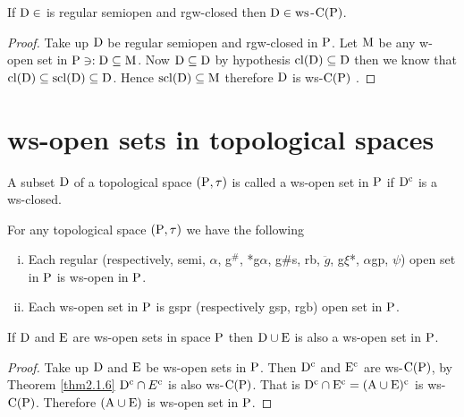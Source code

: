 \begin{thm}\label{thm2.1.25}
If $\mathrm{D}\in$ is regular semiopen and rgw-closed then $\mathrm{D}\in\mathrm{ws}$-$\mathrm{C}(\mathrm{P})$.
\end{thm}

\begin{proof}
Take up $\mathrm{D}$ be regular semiopen and rgw-closed in $\mathrm{P}$. Let $\mathrm{M}$ be any w-open set in $\mathrm{P} \ni: \mathrm{D}\subseteq \mathrm{M}$. Now $\mathrm{D}\subseteq \mathrm{D}$ by hypothesis $\mathrm{cl}(\mathrm{D})\subseteq \mathrm{D}$ then we know that $\mathrm{cl}(\mathrm{D}) \subseteq \mathrm{scl}(\mathrm{D})\subseteq \mathrm{D}$. Hence $\mathrm{scl}(\mathrm{D})\subseteq \mathrm{M}$ therefore $\mathrm{D}$ is ws-$\mathrm{C}(\mathrm{P})$ .
\end{proof}

\section{ws-open sets in topological spaces}\label{sec2.2}

\begin{dfn}\label{defi2.2.1}
A subset $\mathrm{D}$ of a topological space $(\mathrm{P},\tau)$ is called a ws-open set in $\mathrm{P}$ if $\mathrm{D}^{\text{c}}$ is a ws-closed.
\end{dfn}

\begin{thm}\label{thm2.2.1}
For any topological space $(\mathrm{P},\tau)$ we have the following
\begin{enumerate}[(i)]
\item Each regular (respectively, semi, $\alpha$, g$^{\#}$, *g$\alpha$, g\#s, rb, $\ddot{g}$, g$\xi$*, $\alpha$gp, $\psi$) open set in $\mathrm{P}$ is ws-open in $\mathrm{P}$.
\item Each ws-open set in $\mathrm{P}$ is gspr (respectively gsp, rgb) open set in $\mathrm{P}$.
\end{enumerate}
\end{thm}

\begin{thm}\label{thm2.2.2}
If $\mathrm{D}$ and $\mathrm{E}$  are ws-open sets in space $\mathrm{P}$ then $\mathrm{D}\cup \mathrm{E}$  is also a ws-open set in $\mathrm{P}$.
\end{thm}

\begin{proof}
Take up $\mathrm{D}$ and $\mathrm{E}$ be ws-open sets in $\mathrm{P}$. Then $\mathrm{D}^{\text{c}}$ and $\mathrm{E}^{\text{c}}$ are ws-$\mathrm{C}(\mathrm{P})$, by Theorem \ref{thm2.1.6} $\mathrm{D}^{\text{c}} \cap E^{\text{c}}$ is also ws-$\mathrm{C}(\mathrm{P})$. That is $\mathrm{D}^{\text{c}} \cap \mathrm{E}^{\text{c}} = (\mathrm{A}\cup \mathrm{E})^{\text{c}}$ is ws-$\mathrm{C}(\mathrm{P})$. Therefore $(\mathrm{A}\cup \mathrm{E})$ is ws-open set in $\mathrm{P}$.
\end{proof}

